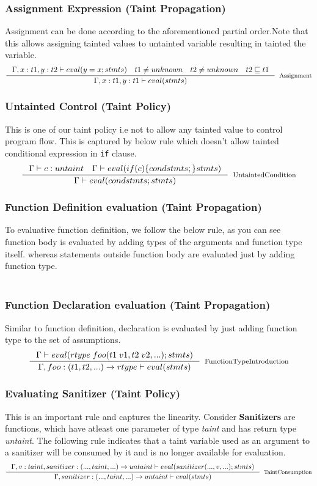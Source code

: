 \documentclass[11pt, pdftex]{article}
\begin{document}
\subsubsection{Assignment Expression (Taint Propagation)}
Assignment can be done according to the aforementioned partial order.Note that this allows assigning tainted values to untainted variable resulting in tainted the variable.
$$ \inference {\Gamma , x:t1 , y:t2 \vdash eval(y=x;stmts) \quad t1 \neq unknown \quad t2 \neq unknown \quad t2 \sqsubseteq t1}{\Gamma , x:t1 , y:t1 \vdash eval(stmts)}[Assignment]$$
\subsubsection{Untainted Control (Taint Policy)}
This is one of our taint policy i.e not to allow any tainted value to control program flow. This is captured by below rule which doesn't allow tainted conditional expression in \texttt{if} clause.
$$ \inference {\Gamma \vdash c:untaint \quad \Gamma \vdash eval(if(c) \{condstmts;\} stmts)}{\Gamma \vdash eval(condstmts;stmts)}[UntaintedCondition]$$
\subsubsection{Function Definition evaluation (Taint Propagation)}
To evaluative function definition, we follow the below rule, as you can see function body is evaluated by adding types of the arguments and function type itself. whereas statements outside function body are evaluated just by adding function type.\\
\\
\subsubsection{Function Declaration evaluation (Taint Propagation)}
Similar to function definition, declaration is evaluated by just adding function type to the set of assumptions.
$$ \inference {\Gamma \vdash eval(rtype \; foo(t1\;v1,t2\;v2,...);stmts)}{\Gamma , foo:(t1,t2,...) \to rtype \vdash eval(stmts)}[FunctionTypeIntroduction]$$
\subsubsection{Evaluating Sanitizer (Taint Policy)}
This is an important rule and captures the linearity. Consider {\bf Sanitizers} are functions, which have atleast one parameter of type \textit{taint} and has return type \textit{untaint}. The following rule indicates that a taint variable used as an argument to a sanitizer will be consumed by it and is no longer available for evaluation.
$$ \inference {\Gamma , v:taint , sanitizer:(...,taint,...) \to untaint \vdash eval(sanitizer(...,v,...);stmts)}{\Gamma , sanitizer:(...,taint,...) \to untaint \vdash eval(stmts)}[TaintConsumption]$$
\end{document}
